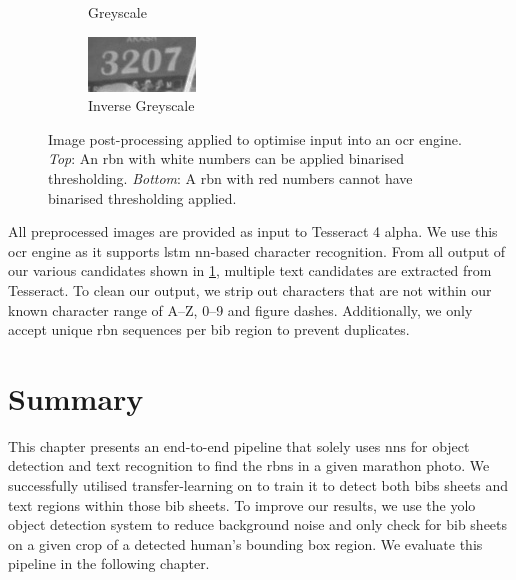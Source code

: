 \begin{figure}[h]
\begin{subfigure}[b]{0.23\textwidth}
    \caption{Greyscale}
  \end{subfigure}
  \hspace{\fill}
  \begin{subfigure}[b]{0.23\textwidth}
    \includegraphics[width=\textwidth]{images/processing/ocr/3207_bw_inv}
    \caption{Inverse Greyscale}
  \end{subfigure}
  \hspace{\fill}
  
  \caption[Image post-processing applied to optimise input into an OCR engine]{Image post-processing applied to optimise input into an \gls{ocr} engine. \textit{Top}: An \gls{rbn} with white numbers can be applied binarised thresholding. \textit{Bottom}: A \gls{rbn} with red numbers cannot have binarised thresholding applied.}
  \label{fig:processing_pipeline:ocr_postprocessing}
\end{figure}

All preprocessed images are provided as input to Tesseract 4 alpha. We use this \gls{ocr} engine as it supports \gls{lstm} \gls{nn}-based character recognition. From all output of our various candidates shown in \cref{fig:processing_pipeline:ocr_postprocessing}, multiple text candidates are extracted from Tesseract. To clean our output, we strip out characters that are not within our known character range of A--Z, 0--9 and figure dashes. Additionally, we only accept unique \gls{rbn} sequences per bib region to prevent duplicates.


\section*{Summary}

This chapter presents an end-to-end pipeline that solely uses \glspl{nn} for object detection and text recognition to find the \glspl{rbn} in a given marathon photo. We successfully utilised transfer-learning on \frcnn{} to train it to detect both bibs sheets and text regions within those bib sheets. To improve our results, we use the \gls{yolo} object detection system to reduce background noise and only check for bib sheets on a given crop of a detected human's bounding box region. We evaluate this pipeline in the following chapter.

